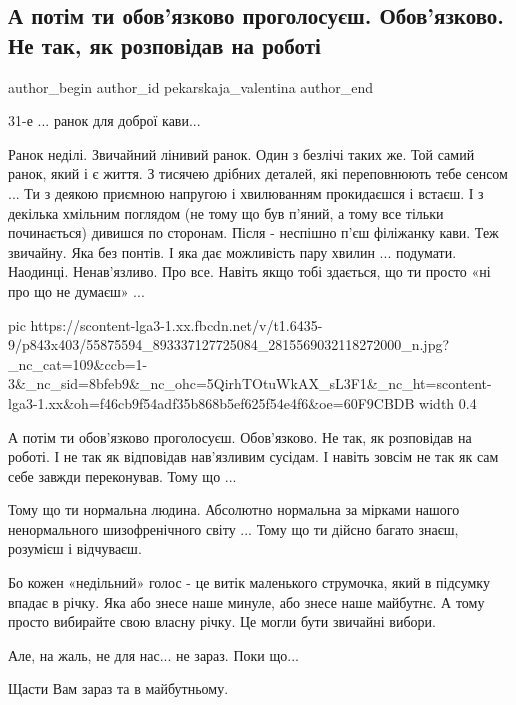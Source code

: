  
 
 
 
 
 
\subsection{А потім ти обов'язково проголосуєш. Обов'язково. Не так, як розповідав на роботі}
\label{sec:31_03_2019.fb.pekarskaja_valentina.1.kava_golosovanie}
\ifcmt
 author_begin
   author_id pekarskaja_valentina
 author_end
\fi

31-е ... ранок для доброї кави...

Ранок неділі. Звичайний лінивий ранок. Один з безлічі таких же. Той самий
ранок, який і є життя. З тисячею дрібних деталей, які переповнюють тебе сенсом
... Ти з деякою приємною напругою і хвилюванням прокидаєшся і встаєш. І з
декілька хмільним поглядом (не тому що був п'яний, а тому все тільки
починається) дивишся по сторонам. Після - неспішно п'єш філіжанку кави. Теж
звичайну. Яка без понтів. І яка дає можливість пару хвилин ... подумати.
Наодинці. Ненав'язливо. Про все. Навіть якщо тобі здається, що ти просто «ні
про що не думаєш» ...

\ifcmt
  pic https://scontent-lga3-1.xx.fbcdn.net/v/t1.6435-9/p843x403/55875594_893337127725084_2815569032118272000_n.jpg?_nc_cat=109&ccb=1-3&_nc_sid=8bfeb9&_nc_ohc=5QirhTOtuWkAX_sL3F1&_nc_ht=scontent-lga3-1.xx&oh=f46cb9f54adf35b868b5ef625f54e4f6&oe=60F9CBDB
  width 0.4
\fi

А потім ти обов'язково проголосуєш. Обов'язково. Не так, як розповідав на
роботі. І не так як відповідав  нав'язливим сусідам. І навіть зовсім не так як
сам себе завжди переконував. Тому що ... 

Тому що ти нормальна людина. Абсолютно нормальна за мірками нашого
ненормального шизофренічного світу ... Тому що ти дійсно багато знаєш, розумієш
і відчуваєш.

Бо кожен «недільний» голос - це витік маленького струмочка, який в підсумку
впадає в річку. Яка або знесе наше минуле, або знесе наше майбутнє. А тому
просто вибирайте свою власну річку.  Це могли бути звичайні вибори. 

Але, на жаль, не для нас... не зараз. Поки що...

Щасти Вам зараз та в майбутньому.

